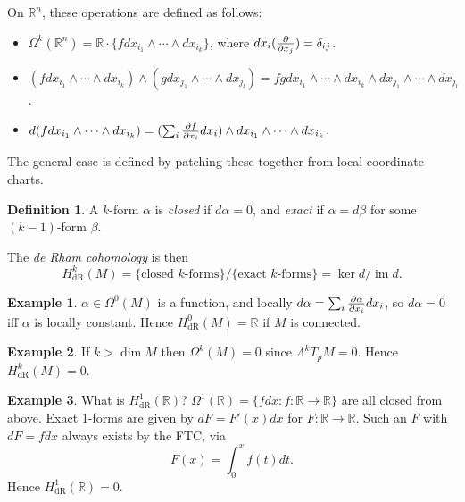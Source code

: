\documentclass{article}
\theoremstyle{definition}
\newtheorem*{definition}{Definition}
\newtheorem*{example}{Example}
\DeclareMathOperator{\im}{im}
\newcommand{\dR}{\mathrm{dR}}
\newcommand{\R}{\mathbb{R}}
\begin{document}
On $\R^n$, these operations are defined as follows:
\begin{itemize}
    \item $\Omega^k(\R^n)=\R\cdot\{fdx_{i_1}\wedge\cdots\wedge dx_{i_k}\}$,
        where $dx_i(\pdv{}{x_j})=\delta_{ij}$.

    \item $(fdx_{i_1}\wedge\cdots\wedge dx_{i_k})
                \wedge(gdx_{j_1}\wedge\cdots\wedge dx_{j_l})
            = fgdx_{i_1}\wedge\cdots\wedge dx_{i_k}
                \wedge dx_{j_1}\wedge\cdots\wedge dx_{j_l}$.

    \item $d(fdx_{i_1}\wedge\cdots\wedge dx_{i_k})
        = (\sum_i\pdv{f}{x_i}dx_i)\wedge dx_{i_1}\wedge\cdots\wedge dx_{i_k}$.
\end{itemize}
The general case is defined by patching these together from local coordinate
charts.

\begin{definition}
    A $k$-form $\alpha$ is \emph{closed} if $d\alpha=0$, and \emph{exact} if
    $\alpha=d\beta$ for some $(k-1)$-form $\beta$.

    The \emph{de Rham cohomology} is then
    \begin{equation*}
        H^k_\dR(M)
            = \{\text{closed $k$-forms}\}/\{\text{exact $k$-forms}\}
            = \ker d/\im d.
    \end{equation*}
\end{definition}

\begin{example}
    $\alpha\in\Omega^0(M)$ is a function, and locally
    $d\alpha=\sum_i\pdv{\alpha}{x_i}dx_i$, so $d\alpha=0$ iff $\alpha$ is
    locally constant. Hence $H^0_\dR(M)=\R$ if $M$ is connected.
\end{example}

\begin{example}
    If $k>\dim M$ then $\Omega^k(M)=0$ since $\Lambda^kT_pM=0$. Hence
    $H^k_\dR(M)=0$.
\end{example}

\begin{example}
    What is $H^1_\dR(\R)$? $\Omega^1(\R)=\{fdx:f:\R\to\R\}$ are all closed from
    above. Exact 1-forms are given by $dF=F'(x)dx$ for $F:\R\to\R$. Such an $F$
    with $dF=fdx$ always exists by the FTC, via
    \begin{equation*}
        F(x) = \int_0^xf(t)dt.
    \end{equation*}
    Hence $H^1_\dR(\R)=0$.
\end{example}
\end{document}
